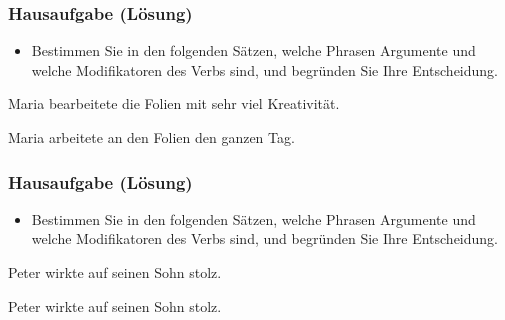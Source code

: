 {

\begin{frame}
\frametitle{Hausaufgabe (Lösung)} 

\begin{itemize}
	
	\item Bestimmen Sie in den folgenden Sätzen, welche Phrasen Argumente und welche Modifikatoren des Verbs sind, und begründen Sie Ihre Entscheidung.
	
\end{itemize}

\ea Maria bearbeitete die Folien mit sehr viel Kreativität.

\pause 
{}



\pause 


\ex Maria arbeitete an den Folien den ganzen Tag.

\pause 
{}



\z 

\end{frame}


\begin{frame}
\frametitle{Hausaufgabe (Lösung)} 

\begin{itemize}
	
	\item Bestimmen Sie in den folgenden Sätzen, welche Phrasen Argumente und welche Modifikatoren des Verbs sind, und begründen Sie Ihre Entscheidung.
	
\end{itemize}

\ea Peter wirkte auf seinen Sohn stolz.

\pause 
{}



\pause 


\ex Peter wirkte auf seinen Sohn stolz.

\pause 
{}


\z 


\end{frame}
}



